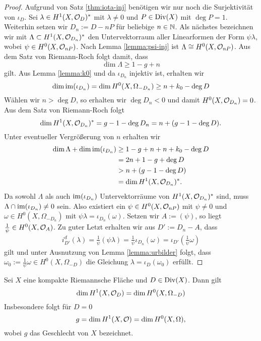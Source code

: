 \begin{proof}
  Aufgrund von Satz \ref{thm:iota-inj} benötigen wir nur noch die
  Surjektivität von $\iota_D$. Sei $\lambda \in H^1(X, \mathcal{O}_D)^\ast$
  mit $\lambda \neq 0$ und $P \in \operatorname{Div}(X)$ mit $\deg P = 1$. Weiterhin
  setzen wir $D_n := D - n P$ für beliebige $n \in \mathbb{N}$. Als nächstes
  bezeichnen wir mit $\Lambda \subset H^1(X, \mathcal{O}_{D_n})^\ast$ den
  Untervektorraum aller Linearformen der Form $\psi \lambda$, wobei
  $\psi \in H^0(X, \mathcal{O}_{nP})$. Nach Lemma \ref{lemma:psi-inj} ist
  $\Lambda \cong H^0(X, \mathcal{O}_{nP})$. Aus dem Satz von Riemann-Roch
  folgt damit, dass
  \[
  \dim \Lambda \geq 1 - g + n
  \]
  gilt. Aus Lemma \ref{lemma:k0} und da $\iota_{D_n}$ injektiv ist,
  erhalten wir
  \[
  \dim \operatorname{im}(\iota_{D_n}) = \dim H^0(X, \Omega_{-D_n}) \geq n + k_0 -
  \deg D
  \]
  Wählen wir $n > \deg D$, so erhalten wir $\deg D_n < 0$ und damit
  $H^0(X, \mathcal{O}_{D_n}) = 0$. Aus dem Satz von Riemann-Roch folgt
  \[
  \dim H^1(X, \mathcal{O}_{D_n})^\ast = g - 1 - \deg D_n = n + ( g - 1 -
  \deg D).
  \]
  Unter eventueller Vergrößerung von $n$ erhalten wir
  \begin{align*}
    \dim \Lambda + \dim \operatorname{im}(\iota_{D_n}) & \geq 1 - g + n + n + k_0 -
    \deg D \\
    & = 2 n + 1 - g + \deg D \\
    & > n + (g - 1 - \deg D) \\
    & = \dim H^1(X, \mathcal{O}_{D_n})^\ast.
  \end{align*}
  Da sowohl $\Lambda$ als auch $\operatorname{im}(\iota_{D_n})$ Untervektorräume von
  $H^1(X, \mathcal{O}_{D_n})^\ast$ sind, muss $\Lambda \cap \operatorname{im}(\iota_{D_n})
  \neq 0$ sein. Also existiert ein $\psi \in H^0(X, \mathcal{O}_{nP})$ mit
  $\psi \neq 0$ und $\omega \in H^0(X, \Omega_{-D_n})$ mit $\psi
  \lambda = \iota_{D_n}(\omega)$. Setzen wir $A := (\psi)$, so liegt
  $\frac{1}{\psi} \in H^0(X, \mathcal{O}_A)$. Zu guter Letzt erhalten wir aus
  $D' := D_n - A$, dass
  \begin{align*}
    i_{D'}^d(\lambda) = \frac{1}{\psi} (\psi \lambda) =
    \frac{1}{\psi} \iota_{D_n}(\omega) = \iota_{D'} \left (
      \frac{1}{\psi} \omega \right )
  \end{align*}
  gilt und unter Ausnutzung von Lemma \ref{lemma:urbilder} folgt, dass
  $\omega_0 := \frac{1}{\psi} \omega \in H^0(X, \Omega_{-D})$ die
  Gleichung $\lambda = \iota_D(\omega_0)$ erfüllt.
\end{proof}

\begin{cor}
  \label{cor:dim-1-form}
  Sei $X$ eine kompakte Riemannsche Fläche und $D \in \operatorname{Div}(X)$. Dann
  gilt
  \[
  \dim H^1(X, \mathcal{O}_D) = \dim H^0(X, \Omega_{-D})
  \]
  Insbesondere folgt für $D = 0$
  \[
  g = \dim H^1(X, \mathcal{O}) = \dim H^0(X, \Omega),
  \]
  wobei $g$ das Geschlecht von $X$ bezeichnet.
\end{cor}

